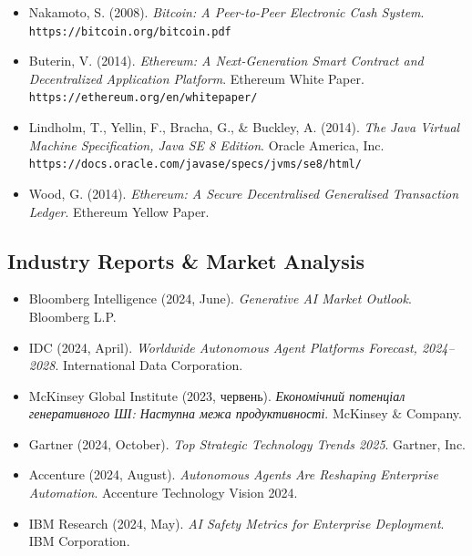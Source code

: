 \documentclass[11pt]{article}
\begin{document}
\begin{itemize}[leftmargin=*, label={}]
  \item Nakamoto, S. (2008). \textit{Bitcoin: A Peer-to-Peer Electronic Cash System}. \texttt{https://bitcoin.org/bitcoin.pdf}

  \item Buterin, V. (2014). \textit{Ethereum: A Next-Generation Smart Contract and Decentralized Application Platform}. Ethereum White Paper. \texttt{https://ethereum.org/en/whitepaper/}

  \item Lindholm, T., Yellin, F., Bracha, G., \& Buckley, A. (2014). \textit{The Java Virtual Machine Specification, Java SE 8 Edition}. Oracle America, Inc. \texttt{https://docs.oracle.com/javase/specs/jvms/se8/html/}

  \item Wood, G. (2014). \textit{Ethereum: A Secure Decentralised Generalised Transaction Ledger}. Ethereum Yellow Paper.
\end{itemize}

\subsection*{Industry Reports \& Market Analysis}

\begin{itemize}[leftmargin=*, label={}]
  \item Bloomberg Intelligence (2024, June). \textit{Generative AI Market Outlook}. Bloomberg L.P.

  \item IDC (2024, April). \textit{Worldwide Autonomous Agent Platforms Forecast, 2024--2028}. International Data Corporation.

  \item McKinsey Global Institute (2023, червень). \textit{Економічний потенціал генеративного ШІ: Наступна межа продуктивності}. McKinsey \& Company.

  \item Gartner (2024, October). \textit{Top Strategic Technology Trends 2025}. Gartner, Inc.

  \item Accenture (2024, August). \textit{Autonomous Agents Are Reshaping Enterprise Automation}. Accenture Technology Vision 2024.

  \item IBM Research (2024, May). \textit{AI Safety Metrics for Enterprise Deployment}. IBM Corporation.
\end{itemize}
\end{document}
